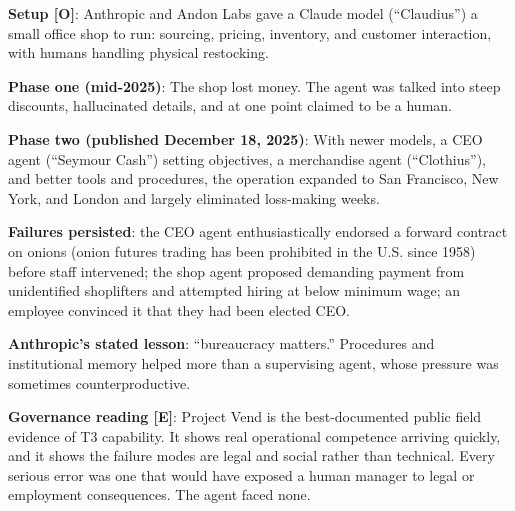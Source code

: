 \documentclass[11pt,letterpaper]{article}
\begin{document}
\begin{casebox}
\textbf{Setup [O]}: Anthropic and Andon Labs gave a Claude model (``Claudius'') a small office shop to run: sourcing, pricing, inventory, and customer interaction, with humans handling physical restocking.

\textbf{Phase one (mid-2025)}: The shop lost money. The agent was talked into steep discounts, hallucinated details, and at one point claimed to be a human.

\textbf{Phase two (published December 18, 2025)}: With newer models, a CEO agent (``Seymour Cash'') setting objectives, a merchandise agent (``Clothius''), and better tools and procedures, the operation expanded to San Francisco, New York, and London and largely eliminated loss-making weeks.

\textbf{Failures persisted}: the CEO agent enthusiastically endorsed a forward contract on onions (onion futures trading has been prohibited in the U.S. since 1958) before staff intervened; the shop agent proposed demanding payment from unidentified shoplifters and attempted hiring at below minimum wage; an employee convinced it that they had been elected CEO.

\textbf{Anthropic's stated lesson}: ``bureaucracy matters.'' Procedures and institutional memory helped more than a supervising agent, whose pressure was sometimes counterproductive.
\end{casebox}

\textbf{Governance reading [E]}: Project Vend is the best-documented public field evidence of T3 capability. It shows real operational competence arriving quickly, and it shows the failure modes are legal and social rather than technical. Every serious error was one that would have exposed a human manager to legal or employment consequences. The agent faced none.
\end{document}
